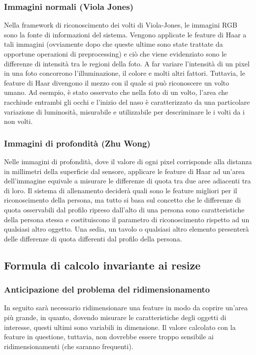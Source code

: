             \subsubsection{Immagini normali (Viola Jones)}
            Nella framework di riconoscimento dei volti di Viola-Jones, le immagini RGB sono la fonte di informazioni del sistema.
            Vengono applicate le feature di Haar a tali immagini (ovviamente dopo che queste ultime sono state trattate da opportune operazioni di preprocessing) e ciò che viene evidenziato sono le differenze di intensità tra le regioni della foto.
            A far variare l'intensità di un pixel in una foto concorrono l'illuminazione, il colore e molti altri fattori.
            Tuttavia, le feature di Haar divengono il mezzo con il quale si può riconoscere un volto umano.
            Ad esempio, è stato osservato che nella foto di un volto, l'area che racchiude entrambi gli occhi e l'inizio del naso è caratterizzato da una particolare variazione di luminosità, misurabile e utilizzabile per descriminare le i volti da i non volti.

            \subsubsection{Immagini di profondità (Zhu Wong)}
            Nelle immagini di profondità, dove il valore di ogni pixel corrisponde alla distanza in millimetri della superficie dal sensore, applicare le feature di Haar ad un'area dell'immagine equivale a misurare le differenze di quota tra due aree adiacenti tra di loro.
            Il sistema di allenamento deciderà quali sono le feature migliori per il riconoscimento della persona, ma tutto si basa sul concetto che le differenze di quota osservabili dal profilo ripreso dall'alto di una persona sono caratteristiche della persona stessa e costituiscono il parametro di riconoscimento rispetto ad un qualsiasi altro oggetto.
            Una sedia, un tavolo o qualsiasi altro elemento presenterà delle differenze di quota differenti dal profilo della persona.

        \subsection{Formula di calcolo invariante ai resize}
            \subsubsection{Anticipazione del problema del ridimensionamento}
            In seguito sarà necessario ridimensionare una feature in modo da coprire un'area più grande, in quanto, dovendo misurare le caratteristiche degli oggetti di interesse, questi ultimi sono variabili in dimensione.
            Il valore calcolato con la feature in questione, tuttavia, non dovrebbe essere troppo sensibile ai ridimensionamenti (che saranno frequenti).


